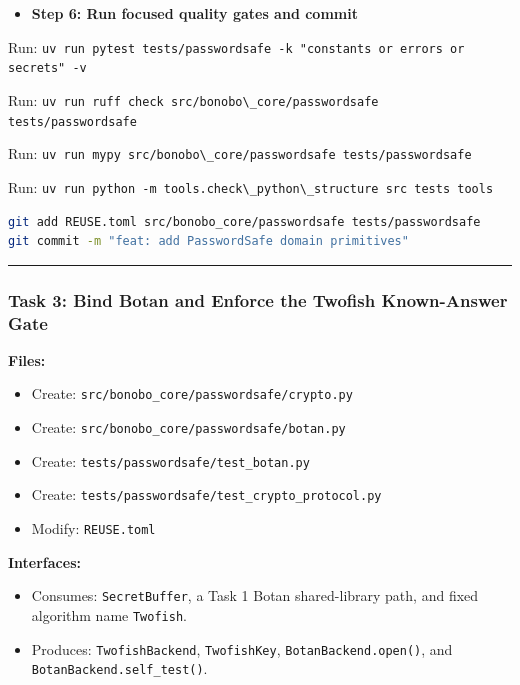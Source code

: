 \documentclass[
  letterpaper,
]{article}
\newcommand{\passthrough}[1]{#1}
\providecommand{\tightlist}{%
  \setlength{\itemsep}{0pt}\setlength{\parskip}{0pt}}
\begin{document}
\begin{itemize}
\tightlist
\item[$\square$]
  \textbf{Step 6: Run focused quality gates and commit}
\end{itemize}

Run: \passthrough{\lstinline!uv run pytest tests/passwordsafe -k "constants or errors or secrets" -v!}

Run: \passthrough{\lstinline!uv run ruff check src/bonobo\_core/passwordsafe tests/passwordsafe!}

Run: \passthrough{\lstinline!uv run mypy src/bonobo\_core/passwordsafe tests/passwordsafe!}

Run: \passthrough{\lstinline!uv run python -m tools.check\_python\_structure src tests tools!}

\begin{lstlisting}[language=bash]
git add REUSE.toml src/bonobo_core/passwordsafe tests/passwordsafe
git commit -m "feat: add PasswordSafe domain primitives"
\end{lstlisting}

\begin{center}\rule{0.5\linewidth}{0.5pt}\end{center}

\subsubsection{Task 3: Bind Botan and Enforce the Twofish Known-Answer
Gate}\label{task-3-bind-botan-and-enforce-the-twofish-known-answer-gate}

\textbf{Files:}

\begin{itemize}
\tightlist
\item
  Create: \nolinkurl{src/bonobo_core/passwordsafe/crypto.py}
\item
  Create: \nolinkurl{src/bonobo_core/passwordsafe/botan.py}
\item
  Create: \nolinkurl{tests/passwordsafe/test_botan.py}
\item
  Create: \nolinkurl{tests/passwordsafe/test_crypto_protocol.py}
\item
  Modify: \nolinkurl{REUSE.toml}
\end{itemize}

\textbf{Interfaces:}

\begin{itemize}
\tightlist
\item
  Consumes: \nolinkurl{SecretBuffer}, a Task 1 Botan shared-library path, and fixed algorithm name
  \passthrough{\lstinline!Twofish!}.
\item
  Produces: \nolinkurl{TwofishBackend}, \nolinkurl{TwofishKey}, \nolinkurl{BotanBackend.open()}, and
  \nolinkurl{BotanBackend.self_test()}.
\end{itemize}
\end{document}
